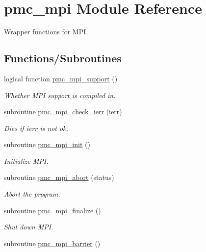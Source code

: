 \hypertarget{namespacepmc__mpi}{}\section{pmc\+\_\+mpi Module Reference}
\label{namespacepmc__mpi}


Wrapper functions for M\+PI.  


\subsection*{Functions/\+Subroutines}
\begin{DoxyCompactItemize}
\item 
logical function \mbox{\hyperlink{namespacepmc__mpi_a3509026df8c8ae7c02e1d9b364f4a651}{pmc\+\_\+mpi\+\_\+support}} ()
\begin{DoxyCompactList}\small\item\em Whether M\+PI support is compiled in. \end{DoxyCompactList}\item 
subroutine \mbox{\hyperlink{namespacepmc__mpi_af7b0af100baf65538aecee298e321e0c}{pmc\+\_\+mpi\+\_\+check\+\_\+ierr}} (ierr)
\begin{DoxyCompactList}\small\item\em Dies if {\ttfamily ierr} is not ok. \end{DoxyCompactList}\item 
subroutine \mbox{\hyperlink{namespacepmc__mpi_a44c84d31a3ed394dc39113fb8232221f}{pmc\+\_\+mpi\+\_\+init}} ()
\begin{DoxyCompactList}\small\item\em Initialize M\+PI. \end{DoxyCompactList}\item 
subroutine \mbox{\hyperlink{namespacepmc__mpi_a9b929bc85dfded58ac602697ab95ef42}{pmc\+\_\+mpi\+\_\+abort}} (status)
\begin{DoxyCompactList}\small\item\em Abort the program. \end{DoxyCompactList}\item 
subroutine \mbox{\hyperlink{namespacepmc__mpi_a9c6189f38473985f2db47a9a6ecce869}{pmc\+\_\+mpi\+\_\+finalize}} ()
\begin{DoxyCompactList}\small\item\em Shut down M\+PI. \end{DoxyCompactList}\item 
subroutine \mbox{\hyperlink{namespacepmc__mpi_aa6ae01b0c4da1bc58e67d3f0206812a8}{pmc\+\_\+mpi\+\_\+barrier}} ()

\end{DoxyCompactItemize}
